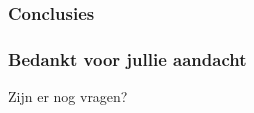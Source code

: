 \documentclass[aspectratio=43]{uva-inf-presentation}
\begin{document}
%
%


\begin{frame}
\frametitle{Conclusies}

\end{frame}


\begin{frame}
\frametitle{Bedankt voor jullie aandacht}
\Large{\centerline{Zijn er nog vragen?}}
\end{frame}
\end{document}
